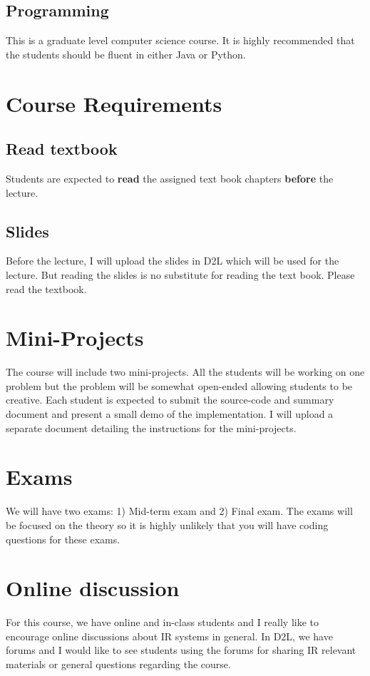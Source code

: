 \documentclass[12pt]{article}
\begin{document}
\subsection{Programming}
This is a graduate level computer science course. It is highly recommended that the students should be fluent in either Java or Python.

\section{Course Requirements}

\subsection{Read textbook}
Students are expected to \textbf{read} the assigned text book chapters \textbf{before} the lecture.
\subsection{Slides}
Before the lecture, I will upload the slides in D2L which will be used for the lecture. But reading the slides is no substitute for reading the text book. Please read the textbook. 

\section{Mini-Projects}
The course will include two mini-projects. All the students will be working on one problem but the problem will be somewhat open-ended allowing students to be creative. Each student is expected to submit the source-code  and summary document and present a small demo of the implementation. I will upload a separate document detailing the instructions for the mini-projects. 

\section{Exams}
We will have two exams: 1) Mid-term exam and 2) Final exam. The exams will be focused  on the theory so it is highly unlikely that you will have coding questions for these exams. 

\section{Online discussion}
For this course, we have online and in-class students and I really like to encourage online discussions about IR systems in general. In D2L, we have forums and I would like to see students using the forums for sharing IR relevant materials or general questions regarding the course. 
\end{document}
